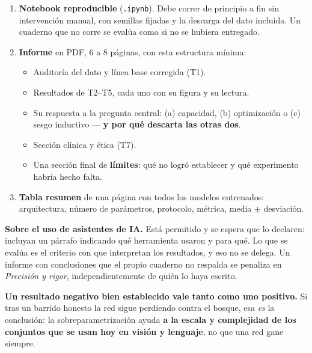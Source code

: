 \documentclass[11pt, a4paper]{article}
\begin{document}
\begin{entrega}
\begin{enumerate}[leftmargin=1.6em]
	\item \textbf{Notebook reproducible} (\texttt{.ipynb}). Debe correr de principio a fin sin intervenci\'on manual, con semillas fijadas y la descarga del dato incluida. Un cuaderno que no corre se eval\'ua como si no se hubiera entregado.
	\item \textbf{Informe} en PDF, 6 a 8 p\'aginas, con esta estructura m\'inima:
	\begin{itemize}
		\item Auditor\'ia del dato y l\'inea base corregida (T1).
		\item Resultados de T2--T5, cada uno con su figura y su lectura.
		\item Su respuesta a la pregunta central: (a) capacidad, (b) optimizaci\'on o (c) sesgo inductivo --- \textbf{y por qu\'e descarta las otras dos}.
		\item Secci\'on cl\'inica y \'etica (T7).
		\item Una secci\'on final de \textbf{l\'imites}: qu\'e no logr\'o establecer y qu\'e experimento habr\'ia hecho falta.
	\end{itemize}
	\item \textbf{Tabla resumen} de una p\'agina con todos los modelos entrenados: arquitectura, n\'umero de par\'ametros, protocolo, m\'etrica, media $\pm$ desviaci\'on.
\end{enumerate}
\end{entrega}

\vspace{0.4em}
\noindent
\textbf{Sobre el uso de asistentes de IA.} Est\'a permitido y se espera que lo declaren: incluyan un p\'arrafo indicando qu\'e herramienta usaron y para qu\'e. Lo que se eval\'ua es el criterio con que interpretan los resultados, y eso no se delega. Un informe con conclusiones que el propio cuaderno no respalda se penaliza en \emph{Precisi\'on y rigor}, independientemente de qui\'en lo haya escrito.

\begin{aviso}
\textbf{Un resultado negativo bien establecido vale tanto como uno positivo.} Si tras un barrido honesto la red sigue perdiendo contra el bosque, esa \emph{es} la conclusi\'on: la sobreparametrizaci\'on ayuda \textbf{a la escala y complejidad de los conjuntos que se usan hoy en visi\'on y lenguaje}, no que una red gane siempre.
\end{aviso}
\end{document}
